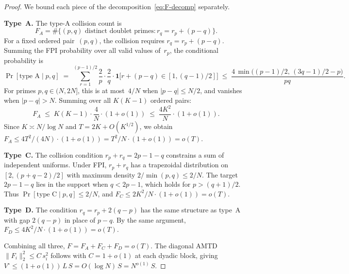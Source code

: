 \documentclass[11pt]{article}
\theoremstyle{definition}
\theoremstyle{remark}
\begin{document}
\begin{proof}
We bound each piece of the
decomposition~\eqref{eq:F-decomp} separately.

\medskip\noindent\textbf{Type~A.}
The type-A collision count is
\[
  F_A = \#\bigl\{(p,q)\text{ distinct doublet primes}
  : r_q = r_p + (p - q)\bigr\}.
\]
For a fixed ordered pair~$(p,q)$, the collision
requires $r_q = r_p + (p-q)$.
Summing the FPI probability over all valid
values of~$r_p$, the conditional probability is
\[
  \Pr[\text{type A} \mid p,q]
  \;=\;
  \sum_{r=1}^{(p-1)/2}
  \frac{2}{p}\cdot\frac{2}{q}\cdot
  \mathbf{1}\bigl[r + (p{-}q) \in [1, (q{-}1)/2]\bigr]
  \;\le\;
  \frac{4\,\min\!\bigl((p{-}1)/2,\,(3q{-}1)/2 - p\bigr)}{pq}.
\]
For primes $p, q \in (N, 2N]$, this is at
most~$4/N$ when $|p-q| \le N/2$,
and vanishes when $|p - q| > N$.
Summing over all $K(K-1)$ ordered pairs:
\[
  F_A
  \;\le\; K(K{-}1)\cdot\frac{4}{N}\cdot(1 + o(1))
  \;\le\; \frac{4K^2}{N}\cdot(1 + o(1)).
\]
Since $K \asymp N/\log N$ and
$T = 2K + O(K^{1/2})$, we obtain
$F_A \le 4T^2/(4N) \cdot (1+o(1))
= T^2/N \cdot (1+o(1)) = o(T)$.

\medskip\noindent\textbf{Type~C.}
The collision condition
$r_p + r_q = 2p - 1 - q$ constrains
a sum of independent uniforms.
Under FPI, $r_p + r_q$ has a
trapezoidal distribution on
$[2, (p+q-2)/2]$ with maximum density
$2/\min(p,q) \le 2/N$.
The target $2p - 1 - q$ lies in the support
when $q < 2p - 1$, which holds for
$p > (q+1)/2$.
Thus $\Pr[\text{type C} \mid p,q] \le 2/N$,
and $F_C \le 2K^2/N \cdot (1+o(1)) = o(T)$.

\medskip\noindent\textbf{Type~D.}
The condition $r_q = r_p + 2(q-p)$
has the same structure as type~A
with gap $2(q-p)$ in place of $p-q$.
By the same argument,
$F_D \le 4K^2/N \cdot (1+o(1)) = o(T)$.

\medskip
Combining all three,
$F = F_A + F_C + F_D = o(T)$.
The diagonal AMTD
$\|F_i\|_2^2 \le C\,s_i^2$ follows
with $C = 1 + o(1)$ at each dyadic block,
giving $V^\circ \le (1 + o(1))\,L\,S
= O(\log N)\,S = N^{o(1)}\,S$.
\end{proof}
\end{document}
